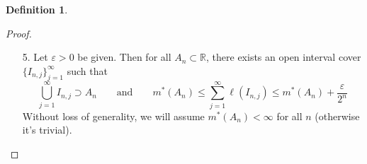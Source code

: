 \documentclass[12pt]{article}
\theoremstyle{plain}
\theoremstyle{definition}
\newtheorem{defn}[thm]{Definition}
\theoremstyle{remark}
\begin{document}
\begin{defn}
\begin{proof}
\begin{enumerate}
($\leq$ Direction) First define $I_1 = (a-\varepsilon, b+\varepsilon)\supset[a,b]$ for all $\varepsilon>0$. Then it's clear that $I_1$ satisfies as an open interval cover of $[a,b]$, and since $m^*$ is the \emph{infimum} of all open interval covers, we have
\begin{align}
    m^*(I) &\leq \ell(I_1) = b-a + 2\varepsilon
        \qquad \forall \varepsilon>0 \notag \\
    \text{Send $\varepsilon\rightarrow0$} \qquad 
    m^*(I) &\leq b-a = \ell(I)
\end{align}

($\geq$ Direction) Next, for any cover $\{I_n\}_1^\infty$ of open intervals covering $[a,b]$, we can apply Heine Borel since $[a,b]$ is compact to get a finite subcover, $\{I_1,\ldots,I_N\}$ such that 
\[
    \bigcup^N_{n=1} I_n \supset [a,b] 
    \quad \Rightarrow \quad
    \sum^N_{n=1} I_n \geq b-a
\]
This last result is easy to prove; the full proof is written in the homework. It just requires induction and being clever about how to order the open intervals. 

And we can do this for any at-most-countable open interval cover, so take the infimum over all such covers to get
\[
    m^*(I) \geq b-a = \ell(I)
\]
Next, for the open interval, we take any $\varepsilon>0$ and use monotonicity before applying the above result concerning closed intervals:
\begin{align*}
    [a+\varepsilon, b-\varepsilon] &\subset
    (a,b) \subset [a,b] \\
    \text{By monotonicity}\qquad
    m^*([a+\varepsilon, b-\varepsilon]) &\leq
    m^*((a,b)) \leq m^*([a,b]) \\
    b-a-2\varepsilon &\leq
    m^*((a,b)) \leq b-a \\
    \text{Since $\varepsilon$ arbitrary }\Rightarrow\qquad
    m^*((a,b)) &= b-a 
\end{align*}
Finally, for all other types of intervals, use monotonicity, squeezing the half-open intervals between the closed and open intervals, and we have all cases covered.

\item[5.] Let $\varepsilon>0$ be given. Then for all $A_n\subset\mathbb{R}$, there exists an open interval cover $\{I_{n,j}\}^\infty_{j=1}$ such that
\begin{equation}
    \label{singcov}
    \bigcup^\infty_{j=1} I_{n,j} \supset A_n   
    \qquad \text{and}\qquad
    m^*(A_n) \leq \sum^\infty_{j=1} \ell(I_{n,j})
    \leq m^*(A_n) + \frac{\varepsilon}{2^n}
\end{equation}
Without loss of generality, we will assume $m^*(A_n)<\infty$ for all $n$ (otherwise it's trivial). 


\end{enumerate}
\end{proof}
\end{defn}
\end{document}
